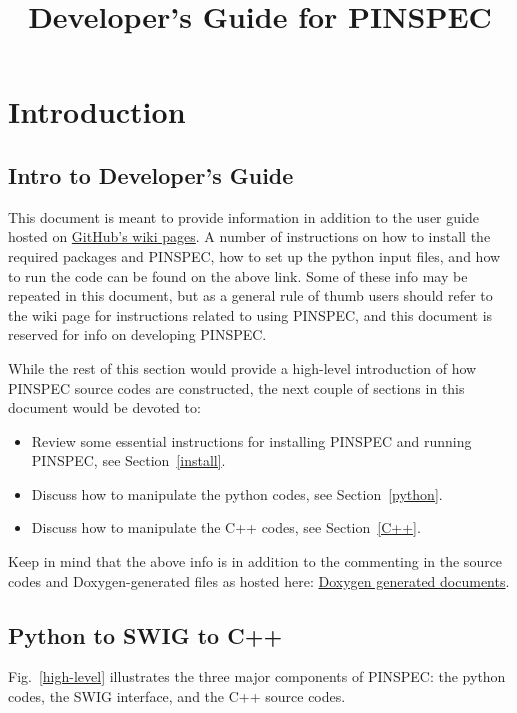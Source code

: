 \documentclass[titlepage]{article}
\begin{document}
\title{Developer's Guide for PINSPEC}
\maketitle

\section{Introduction}
\subsection{Intro to Developer's Guide}
This document is meant to provide information in addition to the user guide hosted on \href{https://github.com/mit-crpg/PINSPEC/wiki}{GitHub's wiki pages}. A number of instructions on how to install the required packages and PINSPEC, how to set up the python input files, and how to run the code can be found on the above link. Some of these info may be repeated in this document, but as a general rule of thumb users should refer to the wiki page for instructions related to using PINSPEC, and this document is reserved for info on developing PINSPEC. 

While the rest of this section would provide a high-level introduction of how PINSPEC source codes are constructed, the next couple of sections in this document would be devoted to:
\begin{itemize}
\item Review some essential instructions for installing PINSPEC and running PINSPEC, see Section~\ref{install}. 
\item Discuss how to manipulate the python codes, see Section~\ref{python}.
\item Discuss how to manipulate the C++ codes, see Section~\ref{C++}. 
\end{itemize}
Keep in mind that the above info is in addition to the commenting in the source codes and Doxygen-generated files as hosted here: \href{http://mit-crpg.github.io/PINSPEC/index.html}{Doxygen generated documents}. 


\clearpage
\subsection{Python to SWIG to C++}
Fig.~\ref{high-level} illustrates the three major components of PINSPEC: the python codes, the SWIG interface, and the C++ source codes. 
\end{document}

